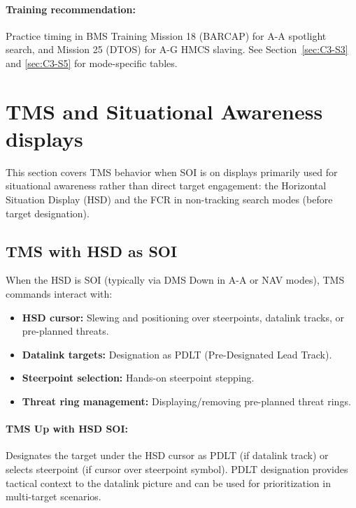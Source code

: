 \documentclass[11pt, a4paper, twoside]{report}
\begin{document}
\paragraph{Training recommendation:}
Practice timing in BMS Training Mission 18 (BARCAP) for A-A spotlight search, and Mission 25 (DTOS) for A-G HMCS slaving. See Section~\ref{sec:C3-S3} and \ref{sec:C3-S5} for mode-specific tables.

\newpage
\section{TMS and Situational Awareness displays}
\label{sec:C4-S2}

This section covers TMS behavior when SOI is on displays primarily used for situational awareness rather than direct target engagement: the Horizontal Situation Display (HSD) and the FCR in non-tracking search modes (before target designation).

\subsection{TMS with HSD as SOI}
\label{sec:C4-S2-S1}

When the HSD is SOI (typically via DMS Down in A-A or NAV modes), TMS commands interact with:
\begin{itemize}
    \item \textbf{HSD cursor:} Slewing and positioning over steerpoints, datalink tracks, or pre-planned threats.
    \item \textbf{Datalink targets:} Designation as PDLT (Pre-Designated Lead Track).
    \item \textbf{Steerpoint selection:} Hands-on steerpoint stepping.
    \item \textbf{Threat ring management:} Displaying/removing pre-planned threat rings.
\end{itemize}

\paragraph{TMS Up with HSD SOI:}
Designates the target under the HSD cursor as PDLT (if datalink track) or selects steerpoint (if cursor over steerpoint symbol). PDLT designation provides tactical context to the datalink picture and can be used for prioritization in multi-target scenarios.
\end{document}

